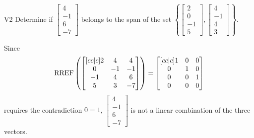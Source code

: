 \begin{problem}{V2}
  Determine if
  \(\begin{bmatrix} 4 \\ -1 \\ 6 \\ -7 \end{bmatrix}\)
  belongs to the span of the set
  \(\left\{
    \begin{bmatrix} 2 \\ 0 \\ -1 \\ 5 \end{bmatrix},
    \begin{bmatrix} 4 \\ -1 \\ 4 \\ 3 \end{bmatrix}
    \right\}
  \).
\end{problem}
\begin{solution}
  Since
  \[
    \operatorname{RREF}\left(
      \begin{bmatrix}[cc|c]
        2 & 4 & 4 \\
        0 & -1 & -1 \\
        -1 & 4 & 6 \\
        5 & 3 & -7
      \end{bmatrix}
    \right) =
    \begin{bmatrix}[cc|c]
      1 & 0 & 0 \\
      0 & 1 & 0 \\
      0 & 0 & 1 \\
      0 & 0 & 0
    \end{bmatrix}
  \]
  requires the contradiction \(0=1\),
  \(\begin{bmatrix} 4 \\ -1 \\ 6 \\ -7 \end{bmatrix}\) is
  not a linear combination of the three vectors.
\end{solution}


